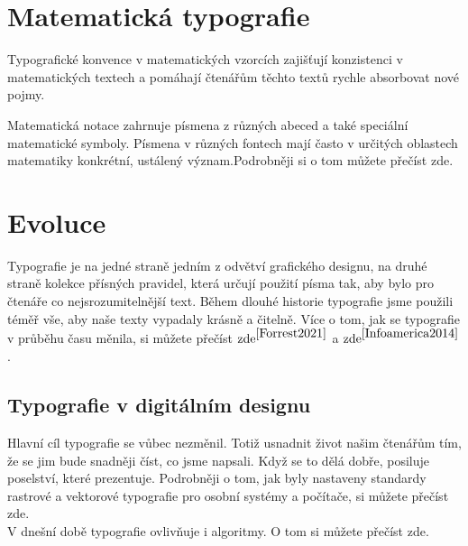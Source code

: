 \documentclass[a4paper, 11pt]{article}
\begin{document}
    \section{Matematická typografie}
    Typografické konvence v matematických vzorcích zajišťují konzistenci v matematických textech a pomáhají čtenářům těchto textů rychle absorbovat nové pojmy.
    
    Matematická notace zahrnuje písmena z různých abeced a také speciální matematické symboly. Písmena v různých fontech mají často v určitých oblastech matematiky konkrétní, ustálený význam.Podrobněji si o tom můžete přečíst zde.\cite{Knuth1979}
    
    \section{Evoluce}
    Typografie je na jedné straně jedním z odvětví grafického designu, na druhé straně kolekce přísných pravidel, která určují použití písma tak, aby bylo pro čtenáře co nejsrozumitelnější text. Během dlouhé historie typografie jsme použili téměř vše, aby naše texty vypadaly krásně a čitelně. Více o tom, jak se typografie v průběhu času měnila, si můžete přečíst $\textup{zde}^{\cite{Forrest2021}}$ a $\textup{zde}^{\cite{Infoamerica2014}}$.
    
    \subsection{Typografie v digitálním designu}
    Hlavní cíl typografie se vůbec nezměnil. Totiž usnadnit život našim čtenářům tím, že se jim bude snadněji číst, co jsme napsali. Když se to dělá dobře, posiluje poselství, které prezentuje.
    Podrobněji o tom, jak byly nastaveny standardy rastrové a vektorové typografie pro osobní systémy a počítače, si můžete přečíst zde.\cite{Charles1983}
    \\
    V dnešní době typografie ovlivňuje i algoritmy. O tom si můžete přečíst zde.\cite{Arnold2020}
    
    \newpage
	
	\renewcommand{\refname}{Literatura}
	
\end{document}
